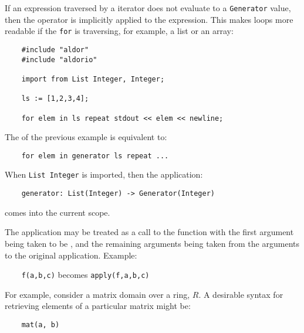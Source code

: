 
If an expression traversed by a  iterator does not evaluate
to a {\tt Generator} value, then the operator  is
implicitly applied to the expression. This makes loops more readable
if the {\tt for} is traversing, for example, a list or an array:

\begin{small}%
\begin{verbatim}
    #include "aldor"
    #include "aldorio"

    import from List Integer, Integer;

    ls := [1,2,3,4];

    for elem in ls repeat stdout << elem << newline;
\end{verbatim}
\end{small}

The  of the previous example is
equivalent to:

\begin{small}
\begin{verbatim}
    for elem in generator ls repeat ...
\end{verbatim}
\end{small}

When {\tt List Integer} is imported, then the application:

{\small \verb^    generator: List(Integer) -> Generator(Integer)^}

comes into the current scope.



The application  may be treated as a call to the function
 with the first argument being taken to be , and
the remaining arguments being taken from the arguments to the original
application.  Example:

\verb^    ^{\tt f(a,b,c)} becomes {\tt apply(f,a,b,c)}

For example, consider a matrix domain over a ring, $R$. A desirable
syntax for retrieving elements of a particular matrix might be:

\begin{small}
\begin{verbatim}
    mat(a, b)
\end{verbatim}
\end{small}

